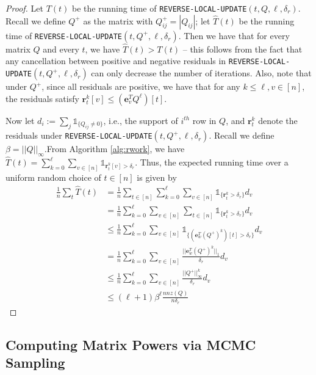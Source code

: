 \begin{proof}
Let $T(t)$ be the running time of \texttt{REVERSE-LOCAL-UPDATE}$(t,Q,\ell,\delta_r)$.
Recall we define $Q^+$ as the matrix with $Q^+_{ij} = |Q_{ij}|$; let $\hat{T}(t)$ be the running time of \texttt{REVERSE-LOCAL-UPDATE}$(t,Q^+,\ell,\delta_r)$. 
Then we have that for every matrix $Q$ and every $t$, we have $\hat{T}(t)>T(t)$ -- this follows from the fact that any cancellation between positive and negative residuals in \texttt{REVERSE-LOCAL-UPDATE}$(t,Q^+,\ell,\delta_r)$ can only decrease the number of iterations. 
Also, note that under $Q^+$, since all residuals are positive, we have that for any $k\leq\ell,v\in[n]$, the residuals satisfy $\mathbf{r}_t^{k}[v]\leq \left(\mathbf{e}_v^TQ^\ell\right)[t]$.

Now let $d_i := \sum_j\mathds{1}_{\{Q_{ij}\neq 0\}}$, i.e., the support of $i^{th}$ row in $Q$, and $\mathbf{r}_t^{k}$ denote the residuals under \texttt{REVERSE-LOCAL-UPDATE}$(t,Q^+,\ell,\delta_r)$. 
Recall we define $\beta = ||Q||_{\infty}$.From Algorithm \ref{alg:rwork}, we have $\hat{T}(t) = \sum_{k=0}^{\ell}\sum_{v\in[n]}\mathds{1}_{\mathbf{r}_t^{k}[v]>\delta_r}$.
Thus, the expected running time over a uniform random choice of $t\in[n]$ is given by
\begin{align*}
\frac{1}{n}\sum_t\hat{T}(t) &= \frac{1}{n}\sum_{t\in[n]}\sum_{k=0}^{\ell}\sum_{v\in[n]}\mathds{1}_{\{\mathbf{r}_t^{k}>\delta_r\}}d_v\\
&=\frac{1}{n}\sum_{k=0}^{\ell}\sum_{v\in[n]}\sum_{t\in[n]}\mathds{1}_{\{\mathbf{r}_t^{k}>\delta_r\}}d_v\\
&\leq\frac{1}{n}\sum_{k=0}^{\ell}\sum_{v\in[n]} \mathds{1}_{\{\left(\mathbf{e}_w^T(Q^+)^k\right)[t]>\delta_r\}}d_v\\
&=\frac{1}{n}\sum_{k=0}^{\ell}\sum_{v\in[n]} \frac{||\mathbf{e}_w^T(Q^+)^k||_1}{\delta_r}d_v\\
&\leq\frac{1}{n}\sum_{k=0}^{\ell}\sum_{v\in[n]} \frac{||Q^+||_{\infty}^k}{\delta_r}d_v\\
&\leq\left(\ell+1\right)\beta^{\ell} \frac{nnz(Q)}{n\delta_r}
\end{align*}
\end{proof}


\subsection{Computing Matrix Powers via MCMC Sampling}
\label{ssec:forwardwork}



